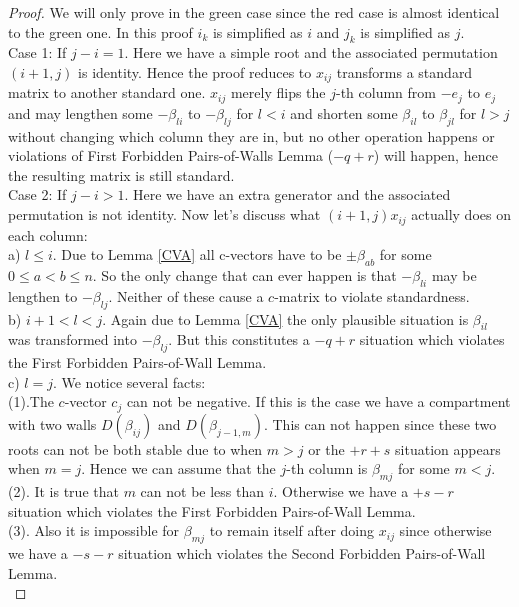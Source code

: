 \begin{proof}
\indent We will only prove in the green case since the red case is almost identical to the green one. In this proof $i_k$ is simplified as $i$ and $j_k$ is simplified as $j$.\\
\indent Case 1: If $j - i  = 1$. Here we have a simple root and the associated permutation $(i+1,j)$ is identity. Hence the proof reduces to $x_{ij}$ transforms a standard matrix to another standard one. $x_{ij}$ merely flips the $j$-th column from $-e_j$ to $e_j$ and may lengthen some $-\beta_{li}$ to $-\beta_{lj}$ for $l<i$ and shorten some $\beta_{il}$ to $\beta_{jl}$ for $l>j$ without changing which column they are in, but no other operation happens or violations of First Forbidden Pairs-of-Walls Lemma ($-q+r$) will happen, hence the resulting matrix is still standard.\\
\indent Case 2: If $j - i > 1$. Here we have an extra generator and the associated permutation is not identity. Now let's discuss what $(i+1,j) x_{ij}$ actually does on each column:\\
\indent a) $l\leq i$. Due to Lemma \ref{CVA} all c-vectors have to be $\pm\beta_{ab}$ for some $0\leq a<b\leq n$. So the only change that can ever happen is that $-\beta_{li}$ may be lengthen to $-\beta_{lj}$. Neither of these cause a $c$-matrix to violate standardness.\\
\indent b) $i + 1 < l < j$. Again due to Lemma \ref{CVA} the only plausible situation is $\beta_{il}$ was transformed into $-\beta_{lj}$. But this constitutes a $-q+r$ situation which violates the First Forbidden Pairs-of-Wall Lemma.\\
\indent c) $l = j$. We notice several facts:\\
\indent (1).The $c$-vector $c_j$ can not be negative. If this is the case we have a compartment with two walls $D(\beta_{ij})$ and $D(\beta_{j-1,m})$. This can not happen since these two roots can not be both stable due to \cite{ST12} when $m>j$ or the $+r+s$ situation appears when $m=j$. Hence we can assume that the $j$-th column is $\beta_{mj}$ for some $m<j$.\\
\indent (2). It is true that $m$ can not be less than $i$. Otherwise we have a $+s-r$ situation which violates the First Forbidden Pairs-of-Wall Lemma.\\
\indent (3). Also it is impossible for $\beta_{mj}$ to remain itself after doing $x_{ij}$ since otherwise we have a $-s-r$ situation which violates the Second Forbidden Pairs-of-Wall Lemma.\\

\end{proof}
